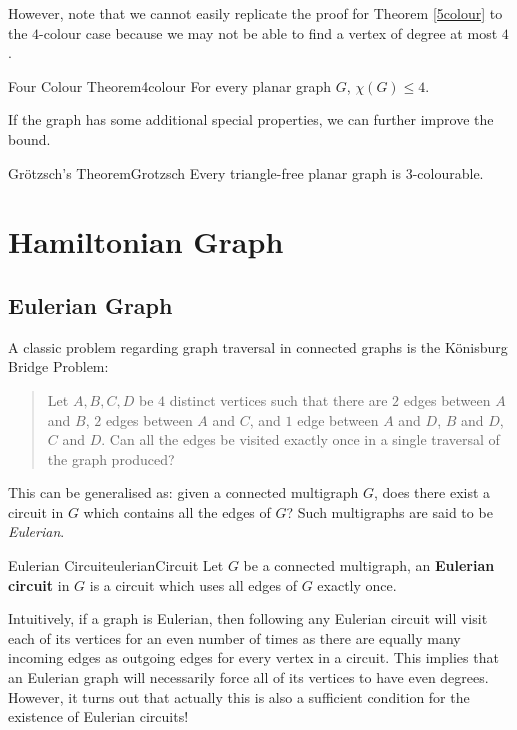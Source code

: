 \documentclass[math, code]{amznotes}
\theoremstyle{remark}
\begin{document}
However, note that we cannot easily replicate the proof for Theorem \ref{5colour} to the $4$-colour case because we may not be able to find a vertex of degree at most $4$. 
\begin{thmbox}{Four Colour Theorem}{4colour}
    For every planar graph $G$, $\chi(G) \leq 4$.
\end{thmbox}
If the graph has some additional special properties, we can further improve the bound.
\begin{thmbox}{Gr\"{o}tzsch's Theorem}{Grotzsch}
    Every triangle-free planar graph is $3$-colourable.
\end{thmbox}
\chapter{Hamiltonian Graph}
\section{Eulerian Graph}
A classic problem regarding graph traversal in connected graphs is the K\"{o}nisburg Bridge Problem:
\begin{quote}
    Let $A, B, C, D$ be $4$ distinct vertices such that there are $2$ edges between $A$ and $B$, $2$ edges between $A$ and $C$, and $1$ edge between $A$ and $D$, $B$ and $D$, $C$ and $D$. Can all the edges be visited exactly once in a single traversal of the graph produced?
\end{quote}
This can be generalised as: given a connected multigraph $G$, does there exist a circuit in $G$ which contains all the edges of $G$? Such multigraphs are said to be \textit{Eulerian}.
\begin{dfnbox}{Eulerian Circuit}{eulerianCircuit}
    Let $G$ be a connected multigraph, an {\color{red} \textbf{Eulerian circuit}} in $G$ is a circuit which uses all edges of $G$ exactly once.
\end{dfnbox}
Intuitively, if a graph is Eulerian, then following any Eulerian circuit will visit each of its vertices for an even number of times as there are equally many incoming edges as outgoing edges for every vertex in a circuit. This implies that an Eulerian graph will necessarily force all of its vertices to have even degrees. However, it turns out that actually this is also a sufficient condition for the existence of Eulerian circuits!
\end{document}
